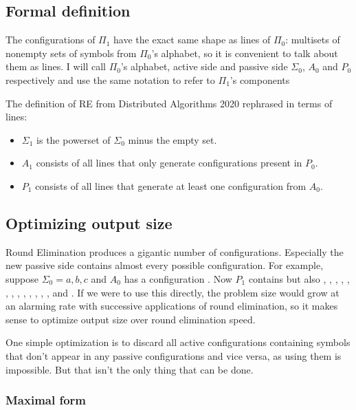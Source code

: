 \documentclass[english, 12pt, a4paper, sci, a-1b, online]{aaltothesis}
\begin{document}
\subsection{Formal definition}
The configurations of $\Pi_1$ have the exact same shape as lines of $\Pi_0$: multisets of nonempty sets of symbols from $\Pi_0$'s alphabet, so it is convenient to talk about them as lines. I will call $\Pi_0$'s alphabet, active side and passive side $\Sigma_0$, $A_0$ and $P_{0}$ respectively and use the same notation to refer to $\Pi_{1}$'s components

The definition of RE from Distributed Algorithms 2020\cite{DA2020} rephrased in terms of lines:
\begin{itemize}
  \item $\Sigma_1$ is the powerset of $\Sigma_0$ minus the empty set.
  \item $A_{1}$ consists of all lines that only generate configurations present in $P_{0}$.
  \item $P_1$ consists of all lines that generate at least one configuration from $A_0$.
\end{itemize}

\subsection{Optimizing output size}

Round Elimination produces a gigantic number of configurations. Especially the new passive side contains almost every possible configuration. For example, suppose $\Sigma_{0} = {a, b, c}$ and $A_0$ has a configuration . Now $P_{1}$ contains  but also , , , , , , , , , , , , ,  and . If we were to use this directly, the problem size would grow at an alarming rate with successive applications of round elimination, so it makes sense to optimize output size over round elimination speed.

One simple optimization is to discard all active configurations containing symbols that don't appear in any passive configurations and vice versa, as using them is impossible. But that isn't the only thing that can be done.

\subsubsection{Maximal form}
\end{document}
